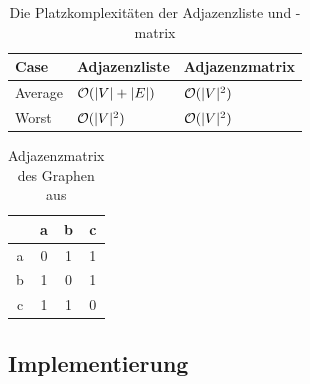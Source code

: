                 \begin{table}
                    \centering
                    \begin{tabular}{|l|l|l|} \hline 
                        \textbf{Case} & \textbf{Adjazenzliste} & \textbf{Adjazenzmatrix}\\ \hline
                        Average & $\mathcal{O}(|V| + |E|)$ & $\mathcal{O}(|V|^2)$\\
                        Worst & $\mathcal{O}(|V|^2)$ & $\mathcal{O}(|V|^2)$\\ \hline
                        
                    \end{tabular}
                    \caption{Die Platzkomplexitäten der Adjazenzliste und -matrix\\\cite{EZ:Web40}}
                    \label{tab:adjacency-space-complexities}
                \end{table}
                
                \begin{table}
                    \centering
                    \begin{tabular}{c|ccc}
                          & a & b & c\\ \hline 
                        a & 0 & 1 & 1\\
                        b & 1 & 0 & 1\\
                        c & 1 & 1 & 0\\
                    \end{tabular}
                    \caption{Adjazenzmatrix des Graphen aus }
                    \label{tab:adjacency-matrix}
                \end{table}

        \subsection{Implementierung}

